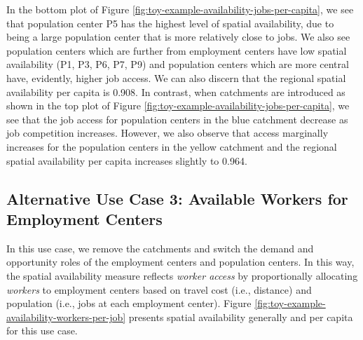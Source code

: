 \documentclass[]{elsarticle} %
\begin{document}
In the bottom plot of Figure
\ref{fig:toy-example-availability-jobs-per-capita}, we see that
population center P5 has the highest level of spatial availability, due
to being a large population center that is more relatively close to
jobs. We also see population centers which are further from employment
centers have low spatial availability (P1, P3, P6, P7, P9) and
population centers which are more central have, evidently, higher job
access. We can also discern that the regional spatial availability per
capita is 0.908. In contrast, when catchments are introduced as shown in
the top plot of Figure
\ref{fig:toy-example-availability-jobs-per-capita}, we see that the job
access for population centers in the blue catchment decrease as job
competition increases. However, we also observe that access marginally
increases for the population centers in the yellow catchment and the
regional spatial availability per capita increases slightly to 0.964.

\hypertarget{alternative-use-case-3-available-workers-for-employment-centers}{%
\subsection{Alternative Use Case 3: Available Workers for Employment
Centers}\label{alternative-use-case-3-available-workers-for-employment-centers}}

In this use case, we remove the catchments and switch the demand and
opportunity roles of the employment centers and population centers. In
this way, the spatial availability measure reflects \emph{worker access}
by proportionally allocating \emph{workers} to employment centers based
on travel cost (i.e., distance) and population (i.e., jobs at each
employment center). Figure
\ref{fig:toy-example-availability-workers-per-job} presents spatial
availability generally and per capita for this use case.
\end{document}
